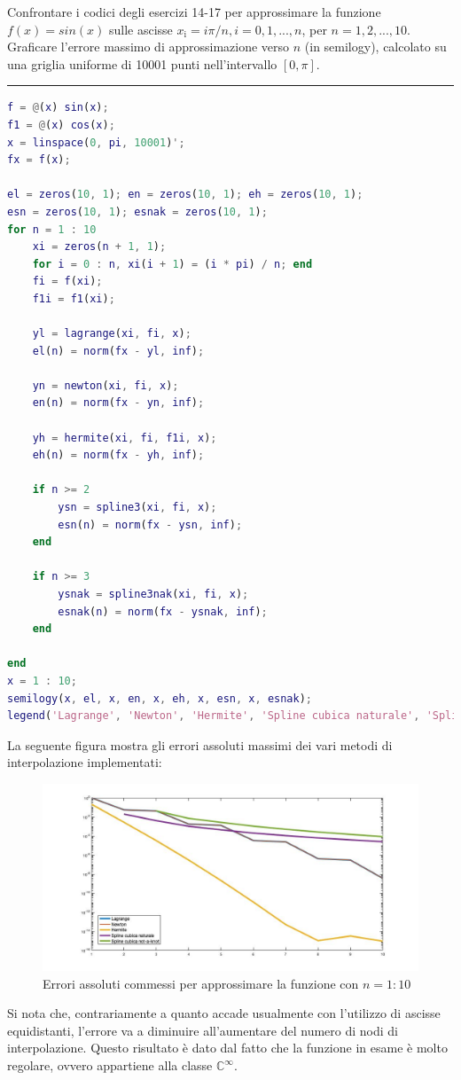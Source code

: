 Confrontare i codici degli esercizi 14-17 per approssimare la funzione $f(x)=sin(x)$ sulle ascisse $x_\mathrm{i}=i\pi/n,i=0,1,...,n$, per $n=1,2,...,10$.
Graficare l'errore massimo di approssimazione verso $n$ (in semilogy), calcolato su una griglia uniforme di 10001 punti nell'intervallo $[0,\pi]$.

\hspace*{\fill}
\par\noindent\rule{\textwidth}{0.4pt}
\hspace*{\fill}

\begin{lstlisting}[language=Matlab, caption=Codice Matlab]
f = @(x) sin(x);
f1 = @(x) cos(x);
x = linspace(0, pi, 10001)';
fx = f(x);

el = zeros(10, 1); en = zeros(10, 1); eh = zeros(10, 1);
esn = zeros(10, 1); esnak = zeros(10, 1);
for n = 1 : 10
	xi = zeros(n + 1, 1);
	for i = 0 : n, xi(i + 1) = (i * pi) / n; end
	fi = f(xi);
	f1i = f1(xi);

	yl = lagrange(xi, fi, x);
	el(n) = norm(fx - yl, inf);

	yn = newton(xi, fi, x);
	en(n) = norm(fx - yn, inf);

	yh = hermite(xi, fi, f1i, x);
	eh(n) = norm(fx - yh, inf);

	if n >= 2
		ysn = spline3(xi, fi, x);
		esn(n) = norm(fx - ysn, inf);
	end

	if n >= 3
		ysnak = spline3nak(xi, fi, x);
		esnak(n) = norm(fx - ysnak, inf);
	end

end
x = 1 : 10;
semilogy(x, el, x, en, x, eh, x, esn, x, esnak);
legend('Lagrange', 'Newton', 'Hermite', 'Spline cubica naturale', 'Spline cubica not-a-knot');
\end{lstlisting}

La seguente figura mostra gli errori assoluti massimi dei vari metodi di interpolazione implementati:
\begin{figure}[H]
     \includegraphics[width=\textwidth]{Chapter-4/Exercise-18/plot.jpg}
     \caption*{Errori assoluti commessi per approssimare la funzione con $n = 1: 10$}
\end{figure}
Si nota che, contrariamente a quanto accade usualmente con l'utilizzo di ascisse equidistanti, l'errore va a diminuire all'aumentare del numero di nodi di interpolazione. Questo risultato è dato dal fatto che la funzione in esame è molto regolare, ovvero appartiene alla classe $\mathbb{C}^{\infty}$.
